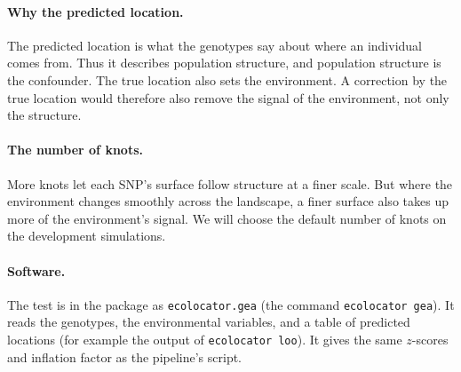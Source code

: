 \paragraph{Why the predicted location.}
The predicted location is what the genotypes say about where an individual
comes from. Thus it describes population structure, and population
structure is the confounder. The true location also sets the environment.
A correction by the true location would therefore also remove the signal
of the environment, not only the structure.

\paragraph{The number of knots.}
More knots let each SNP's surface follow structure at a finer scale. But
where the environment changes smoothly across the landscape, a finer
surface also takes up more of the environment's signal. We will choose the
default number of knots on the development simulations.

\paragraph{Software.}
The test is in the \ecolocator package as \texttt{ecolocator.gea} (the
command \texttt{ecolocator gea}). It reads the genotypes, the
environmental variables, and a table of predicted locations (for example
the output of \texttt{ecolocator loo}). It gives the same $z$-scores and
inflation factor as the pipeline's script.



